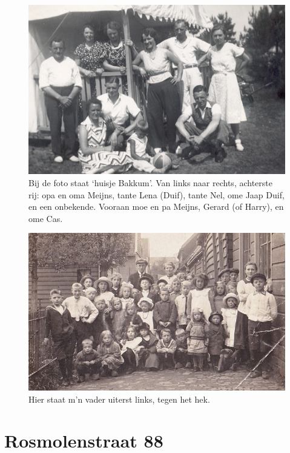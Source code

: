 \documentclass[12pt,twoside, openright]{memoir}
\begin{document}
\begin{figure}
\centering
\includegraphics[width=\textwidth]{img/ch2/ch2-afb12}
\caption*{\footnotesize Bij de foto staat ‘huisje Bakkum’. Van links naar rechts, achterste rij: opa en oma Meijns, tante Lena (Duif), tante Nel, ome Jaap Duif, en een onbekende. Vooraan moe en pa Meijns, Gerard (of Harry), en ome Cas.}
\end{figure}

\begin{figure}
\centering
\includegraphics[width=\textwidth]{img/ch2/ch2-afb13}
\caption*{\footnotesize Hier staat m’n vader uiterst links, tegen het hek.}
\end{figure}


\section*{Rosmolenstraat 88} %
\label{cha:rosmolenstraat}
\end{document}
